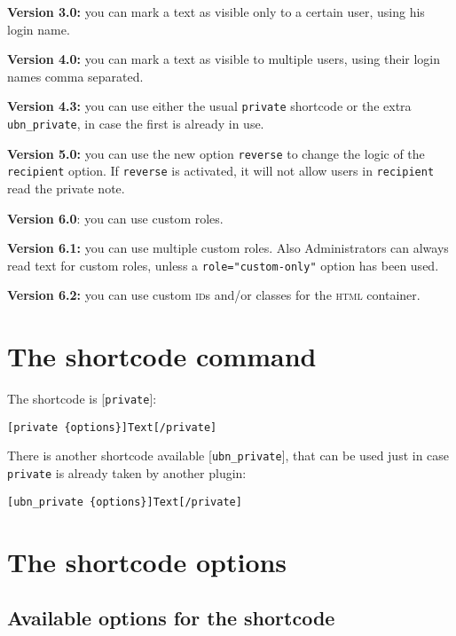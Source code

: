 \documentclass[a4paper,10pt]{article}
\begin{document}
\begin{description}
 \item \textbf{Version 3.0:} you can mark a text as visible only to a certain user, using his login name.
 \item \textbf{Version 4.0:} you can mark a text as visible to multiple users, using their login names comma separated.
 \item \textbf{Version 4.3:} you can use either the usual \verb+private+ shortcode or the extra \verb+ubn_private+, in case the first is already in use.
 \item \textbf{Version 5.0:} you can use the new option \verb+reverse+ to change the logic of the \verb+recipient+ option. If \verb+reverse+ is activated, it will not allow users in \verb+recipient+ read the private note.
 \item \textbf{Version 6.0}: you can use custom roles.
 \item \textbf{Version 6.1:} you can use multiple custom roles. Also Administrators can always read text for custom roles, unless a \verb+role="custom-only"+ option has been used.
 \item \textbf{Version 6.2:} you can use custom \textsc{id}s and/or classes for the \textsc{html} container.
\end{description}

\section{The shortcode command}

The shortcode is [\verb+private+]:

\begin{lstlisting}
[private {options}]Text[/private]
\end{lstlisting}

There is another shortcode available [\verb+ubn_private+], that can be used just in case \verb+private+ is already taken by another plugin:

\begin{lstlisting}
[ubn_private {options}]Text[/private]
\end{lstlisting}

\section{The shortcode options}

\subsection{Available options for the shortcode}
\end{document}

